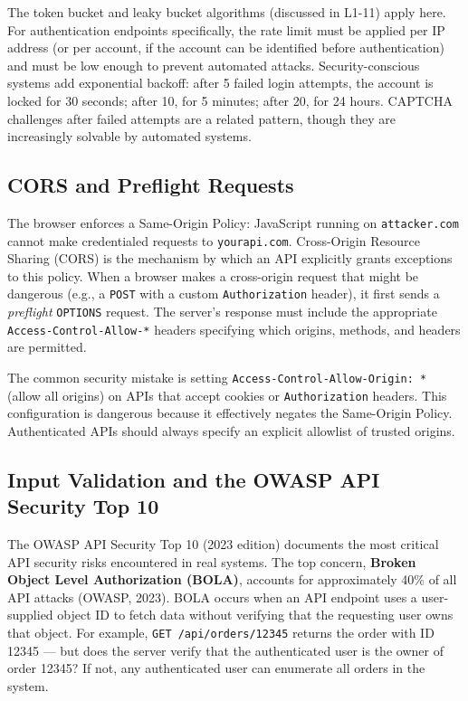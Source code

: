 \documentclass[11pt,a4paper]{article}
\begin{document}
The token bucket and leaky bucket algorithms (discussed in L1-11) apply here. For authentication endpoints specifically, the rate limit must be applied per IP address (or per account, if the account can be identified before authentication) and must be low enough to prevent automated attacks. Security-conscious systems add exponential backoff: after 5 failed login attempts, the account is locked for 30 seconds; after 10, for 5 minutes; after 20, for 24 hours. CAPTCHA challenges after failed attempts are a related pattern, though they are increasingly solvable by automated systems.

\subsection{CORS and Preflight Requests}

The browser enforces a Same-Origin Policy: JavaScript running on \texttt{attacker.com} cannot make credentialed requests to \texttt{yourapi.com}. Cross-Origin Resource Sharing (CORS) is the mechanism by which an API explicitly grants exceptions to this policy. When a browser makes a cross-origin request that might be dangerous (e.g., a \texttt{POST} with a custom \texttt{Authorization} header), it first sends a \textit{preflight} \texttt{OPTIONS} request. The server's response must include the appropriate \texttt{Access-Control-Allow-*} headers specifying which origins, methods, and headers are permitted.

The common security mistake is setting \texttt{Access-Control-Allow-Origin: *} (allow all origins) on APIs that accept cookies or \texttt{Authorization} headers. This configuration is dangerous because it effectively negates the Same-Origin Policy. Authenticated APIs should always specify an explicit allowlist of trusted origins.

\subsection{Input Validation and the OWASP API Security Top 10}

The OWASP API Security Top 10 (2023 edition) documents the most critical API security risks encountered in real systems. The top concern, \textbf{Broken Object Level Authorization (BOLA)}, accounts for approximately 40\% of all API attacks (OWASP, 2023). BOLA occurs when an API endpoint uses a user-supplied object ID to fetch data without verifying that the requesting user owns that object. For example, \texttt{GET /api/orders/12345} returns the order with ID 12345 --- but does the server verify that the authenticated user is the owner of order 12345? If not, any authenticated user can enumerate all orders in the system.
\end{document}
